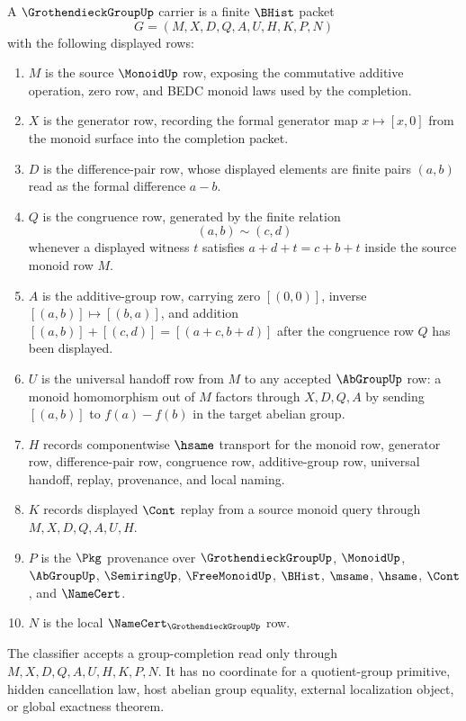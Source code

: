 \begin{definition}
\label{def:grothendieck-group-carrier}
A $\GrothendieckGroupUp$ carrier is a finite $\BHist$ packet
$$
G=(M,X,D,Q,A,U,H,K,P,N)
$$
with the following displayed rows:
\begin{enumerate}
\item $M$ is the source $\MonoidUp$ row, exposing the commutative additive operation, zero row, and BEDC monoid laws used by the completion.
\item $X$ is the generator row, recording the formal generator map $x\mapsto [x,0]$ from the monoid surface into the completion packet.
\item $D$ is the difference-pair row, whose displayed elements are finite pairs $(a,b)$ read as the formal difference $a-b$.
\item $Q$ is the congruence row, generated by the finite relation
$$
(a,b)\sim(c,d)
$$
whenever a displayed witness $t$ satisfies $a+d+t=c+b+t$ inside the source monoid row $M$.
\item $A$ is the additive-group row, carrying zero $[(0,0)]$, inverse $[(a,b)]\mapsto[(b,a)]$, and addition $[(a,b)]+[(c,d)]=[(a+c,b+d)]$ after the congruence row $Q$ has been displayed.
\item $U$ is the universal handoff row from $M$ to any accepted $\AbGroupUp$ row: a monoid homomorphism out of $M$ factors through $X,D,Q,A$ by sending $[(a,b)]$ to $f(a)-f(b)$ in the target abelian group.
\item $H$ records componentwise $\hsame$ transport for the monoid row, generator row, difference-pair row, congruence row, additive-group row, universal handoff, replay, provenance, and local naming.
\item $K$ records displayed $\Cont$ replay from a source monoid query through $M,X,D,Q,A,U,H$.
\item $P$ is the $\Pkg$ provenance over $\GrothendieckGroupUp$, $\MonoidUp$, $\AbGroupUp$, $\SemiringUp$, $\FreeMonoidUp$, $\BHist$, $\msame$, $\hsame$, $\Cont$, and $\NameCert$.
\item $N$ is the local $\NameCert_{\GrothendieckGroupUp}$ row.
\end{enumerate}
The classifier accepts a group-completion read only through $M,X,D,Q,A,U,H,K,P,N$. It has no coordinate for a quotient-group primitive, hidden cancellation law, host abelian group equality, external localization object, or global exactness theorem.
\end{definition}

